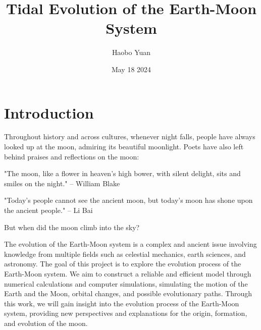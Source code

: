 \documentclass[12pt, letterpaper] {article}
\title{Tidal Evolution of the Earth-Moon System}
\author{Haobo Yuan}
\date{May 18 2024}
\begin{document}
\maketitle

\section{Introduction}
Throughout history and across cultures, whenever night falls, people have always looked up at the moon, admiring its beautiful moonlight. Poets have also left behind praises and reflections on the moon:
\vspace{12pt}

"The moon, like a flower in heaven's high bower, with silent delight, sits and smiles on the night." -- William Blake
\vspace{12pt}

"Today's people cannot see the ancient moon, but today's moon has shone upon the ancient people." -- Li Bai
\vspace{12pt}

But when did the moon climb into the sky?
\vspace{12pt}

The evolution of the Earth-Moon system is a complex and ancient issue involving knowledge from multiple fields such as celestial mechanics, earth sciences, and astronomy. The goal of this project is to explore the evolution process of the Earth-Moon system. We aim to construct a reliable and efficient model through numerical calculations and computer simulations, simulating the motion of the Earth and the Moon, orbital changes, and possible evolutionary paths. Through this work, we will gain insight into the evolution process of the Earth-Moon system, providing new perspectives and explanations for the origin, formation, and evolution of the moon.
\clearpage
\end{document}
